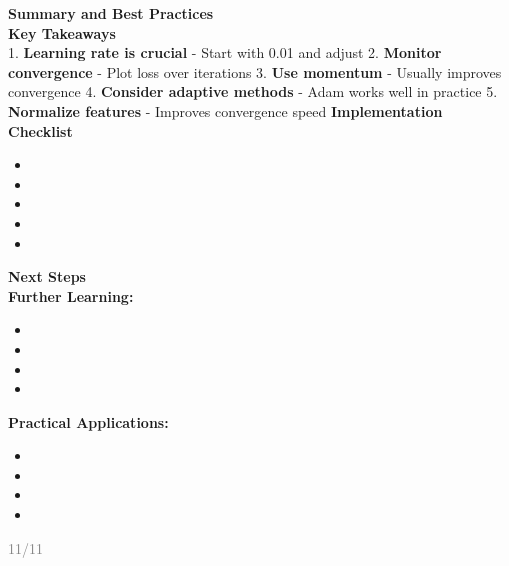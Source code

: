\documentclass[11pt]{article}
\begin{document}
\textbf{\huge Summary and Best Practices}\\[0.5cm]
\textbf{\Large Key Takeaways}\\[0.3cm]
1. \textbf{Learning rate is crucial} - Start with 0.01 and adjust
2. \textbf{Monitor convergence} - Plot loss over iterations
3. \textbf{Use momentum} - Usually improves convergence
4. \textbf{Consider adaptive methods} - Adam works well in practice
5. \textbf{Normalize features} - Improves convergence speed
\textbf{\Large Implementation Checklist}\\[0.3cm]
\begin{itemize}
\item \1
\item \1
\item \1
\item \1
\item \1
\end{itemize}
\textbf{\Large Next Steps}\\[0.3cm]
\textbf{Further Learning:}
\begin{itemize}
\item \1
\item \1
\item \1
\item \1
\end{itemize}
\textbf{Practical Applications:}
\begin{itemize}
\item \1
\item \1
\item \1
\item \1
\end{itemize}

\vfill
\begin{flushright}
\textcolor{gray}{\small 11/11}
\end{flushright}
\end{document}
